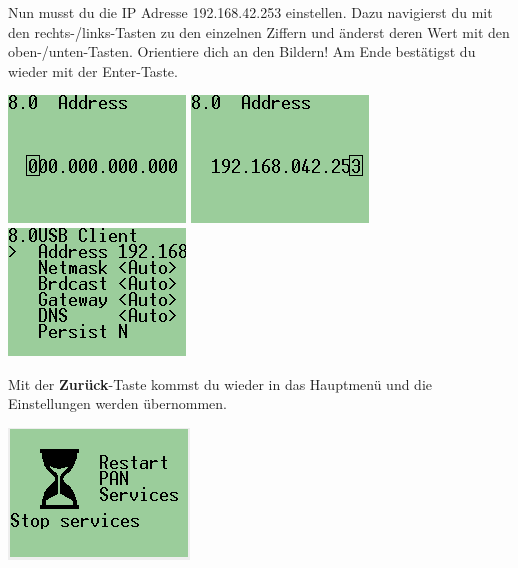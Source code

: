 \documentclass[
	12pt,
	colorbacktitle,
	accentcolor=tud1c,
	german,
	article
]{tuddesign/tudreport}
\begin{document}
\begin{enumerate}
			Nun musst du die IP Adresse 192.168.42.253 einstellen. Dazu navigierst du mit den rechts-/links-Tasten zu den einzelnen Ziffern und änderst deren Wert mit den oben-/unten-Tasten. Orientiere dich an den Bildern! Am Ende bestätigst du wieder mit der Enter-Taste. 
			
			\includegraphics[width=.3\textwidth]{img/ev3_pan_usb_setip1.png}
			\includegraphics[width=.3\textwidth]{img/ev3_pan_usb_setip2.png}
			\includegraphics[width=.3\textwidth]{img/ev3_pan_usb_isset.png}
			
			\begin{minipage}{.6\textwidth}
				\item Mit der \textbf{Zurück}-Taste kommst du wieder in das Hauptmenü und die Einstellungen werden übernommen.
			\end{minipage}
			\hfill
			\begin{minipage}{.3\textwidth}
				\includegraphics[width=\textwidth]{img/ev3_pan_usb_restart.png}
			\end{minipage}
		\end{enumerate}
		
\end{document}
